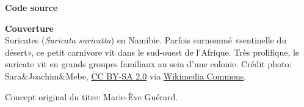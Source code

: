 \begin{frame}[t,plain,fragile=singleslide]
\begin{adjustwidth}{15mm}{15mm}
    \textbf{Code source} \\
    \viewsource{\reposurl}

    \textbf{Couverture} \\
    Suricates (\emph{Suricata suricatta}) en Namibie. Parfois surnommé
    «sentinelle du désert», ce petit carnivore vit dans le sud-ouest
    de l'Afrique. Très prolifique, le suricate vit en grands groupes
    familiaux au sein d'une colonie. Crédit photo: {\textcopyright}
    Sara\&Joachim\&Mebe,
    \href{https://creativecommons.org/licenses/by-sa/2.0/deed.fr}{CC
      BY-SA 2.0} via
    \href{https://commons.wikimedia.org/w/index.php?curid=15305478}{%
      Wikimedia Commons}.

    Concept original du titre: Marie-Ève Guérard.
  \end{adjustwidth}
\end{frame}


